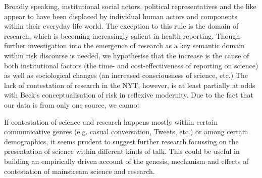 Broadly speaking, institutional social actors, political representatives and the like appear to have been displaced by individual human actors and components within their everyday life world. The exception to this rule is the domain of research, which is becoming increasingly salient in health reporting. Though further investigation into the emergence of research as a key semantic domain within risk discourse is needed, we hypothesise that the increase is the cause of both institutional factors (the time- and cost-effectiveness of reporting on science) as well as sociological changes (an increased consciousness of science, etc.) The lack of contestation of research in the NYT, however, is at least partially at odds with Beck's conceptualisation of risk in reflexive modernity. Due to the fact that our data is from only one source, we cannot 

If contestation of science and research happens mostly within certain communicative genres (e.g. casual conversation, Tweets, etc.) or among certain demographics, it seems prudent to suggest further research focussing on the presentation of science within different kinds of talk. This could be useful in building an empirically driven account of the genesis, mechanism and effects of contestation of mainstream science and research.







